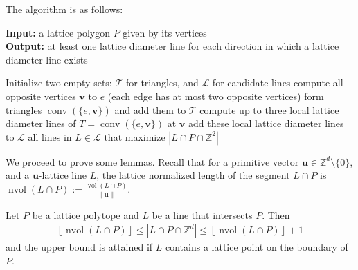 \documentclass[11pt]{article}
\newcommand{\bu}{\mathbf{u}}
\newcommand{\bv}{\mathbf{v}}
\newcommand{\Z}{\mathbb{Z}}
\newcommand{\Lcal}{\mathcal{L}}
\newcommand{\Tcal}{\mathcal{T}}
\DeclareMathOperator{\conv}{conv}
\DeclareMathOperator{\vol}{vol}
\DeclareMathOperator{\spn}{span}
\DeclareMathOperator{\nvol}{nvol}
\begin{document}
The algorithm is as follows:

\begin{algorithm}[ht!]
\caption{\textsc{Computing Lattice Diameter Lines}}
\textbf{Input:} a lattice polygon $P$ given by its vertices \\
\textbf{Output:} at least one lattice diameter line for each direction in which a lattice diameter line exists
\begin{algorithmic}[1]
\State Initialize two empty sets: $\Tcal$ for triangles, and $\Lcal$ for candidate lines
    \State compute all opposite vertices $\bv$ to $e$ (each edge has at most two opposite vertices)
    \State form triangles $\conv(\{e,\bv\})$ and add them to $\Tcal$
\EndFor
\ForAll{triangles in $\Tcal$}
    \State compute up to three local lattice diameter lines of $T=\conv(\{e,\bv\})$ at $\bv$
    \State add these local lattice diameter lines to $\Lcal$
\EndFor
\State \Return all lines in $L \in \Lcal$ that maximize $|L \cap P \cap \Z^2|$
\end{algorithmic}
\end{algorithm}

We proceed to prove some lemmas. Recall that for a primitive vector $\bu \in \Z^d\setminus \{0\}$, and a $\bu$-lattice line $L$, the lattice normalized length of the segment $L \cap P$ is $\nvol(L \cap P) := \frac{\vol(L \cap P)}{\|\bu\|}$.

\begin{lemma}\label{lem:nvol}
    Let $P$ be a lattice polytope and $L$ be a line that intersects $P$. Then
    \begin{align*}
    \left \lfloor \nvol(L \cap P) \right \rfloor \leq |L \cap P \cap \Z^d| \leq  \left \lfloor \nvol(L \cap P) \right \rfloor + 1
    \end{align*}
and the upper bound is attained if $L$ contains a lattice point on the boundary of $P$.
\end{lemma}

    
\end{document}
